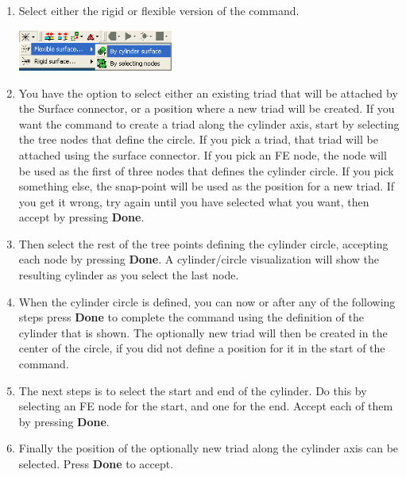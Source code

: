 \begin{enumerate}
\item
  Select either the rigid or flexible version of the command.
  \begin{center}
    \includegraphics[width=0.4\textwidth]{Figures/3-SpiderByCylinder}
  \end{center}

\item
  You have the option to select either an existing triad that will be attached
  by the Surface connector, or a position where a new triad will be created.
  If you want the command to create a triad along the cylinder axis,
  start by selecting the tree nodes that define the circle.
  If you pick a triad, that triad will be attached using the surface connector.
  If you pick an FE node, the node will be used as the first of three nodes that
  defines the cylinder circle. If you pick something else,
  the snap-point will be used as the position for a new triad.
  If you get it wrong, try again until you have selected what you want,
  then accept by pressing \textbf{Done}.

\item
  Then select the rest of the tree points defining the cylinder circle,
  accepting each node by pressing \textbf{Done}.
  A cylinder/circle visualization will show the resulting cylinder
  as you select the last node.

\item
  When the cylinder circle is defined, you can now or after any of the following
  steps press \textbf{Done} to complete the command using the definition of the
  cylinder that is shown.
  The optionally new triad will then be created in the center of the circle,
  if you did not define a position for it in the start of the command.

\item
  The next steps is to select the start and end of the cylinder.
  Do this by selecting an FE node for the start, and one for the end.
  Accept each of them by pressing \textbf{Done}.

\item
  Finally the position of the optionally new triad along the cylinder axis
  can be selected. Press \textbf{Done} to accept.
\end{enumerate}

